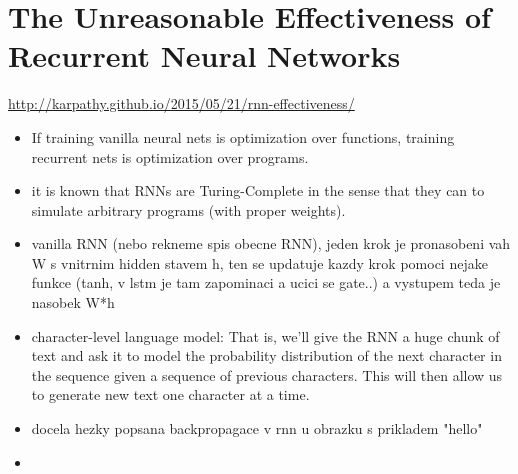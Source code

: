 \section{The Unreasonable Effectiveness of Recurrent Neural Networks}
\url{http://karpathy.github.io/2015/05/21/rnn-effectiveness/}
\begin{itemize}
  \item If training vanilla neural nets is optimization over functions, training recurrent nets is optimization over programs.
  \item it is known that RNNs are Turing-Complete in the sense that they can to simulate arbitrary programs (with proper weights).
  \item vanilla RNN (nebo rekneme spis obecne RNN), jeden krok je pronasobeni vah W s vnitrnim hidden stavem h, ten se updatuje kazdy krok pomoci nejake funkce (tanh, v lstm je tam zapominaci a ucici se gate..) a vystupem teda je nasobek W*h
  \item character-level language model: That is, we’ll give the RNN a huge chunk of text and ask it to model the probability distribution of the next character in the sequence given a sequence of previous characters. This will then allow us to generate new text one character at a time.
  \item docela hezky popsana backpropagace v rnn u obrazku s prikladem "hello"
  \item
\end{itemize}

